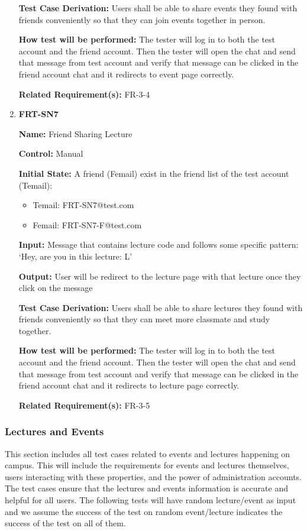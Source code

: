 \documentclass[12pt, titlepage]{article}
\begin{document}
\begin{enumerate}
\textbf{Test Case Derivation:} Users shall be able to share events they found with friends conveniently so that they can join events together in person.
					
\textbf{How test will be performed:} The tester will log in to both the test account and the friend account. Then the tester will open the chat and send that message from test account and verify that message can be clicked in the friend account chat and it redirects to event page correctly.

\textbf{Related Requirement(s):} FR-3-4

\item{\textbf{FRT-SN7}}

\textbf{Name:} Friend Sharing Lecture

\textbf{Control:} Manual
					
\textbf{Initial State:} A friend (Femail) exist in the friend list of the test account (Temail):
\begin{itemize}
\item Temail: FRT-SN7@test.com
\item Femail: FRT-SN7-F@test.com
\end{itemize}

\textbf{Input:} Message that contains lecture code and follows some specific pattern:
`Hey, are you in this lecture: \textunderscore L\textunderscore[SFRWENG 4G06]'
					
\textbf{Output:} User will be redirect to the lecture page with that lecture once they click on the message

\textbf{Test Case Derivation:} Users shall be able to share lectures they found with friends conveniently so that they can meet more classmate and study together.
					
\textbf{How test will be performed:} The tester will log in to both the test account and the friend account. Then the tester will open the chat and send that message from test account and verify that message can be clicked in the friend account chat and it redirects to lecture page correctly.

\textbf{Related Requirement(s):} FR-3-5
\end{enumerate}

\subsubsection{Lectures and Events}

This section includes all test cases related to events and lectures happening on campus. This will include the requirements for events and lectures themselves, users interacting with these properties, and the power of administration accounts. The test cases ensure that the lectures and events information is accurate and helpful for all users. The following tests will have random lecture/event as input and we assume the success of the test on random event/lecture indicates the success of the test on all of them.
\end{document}
